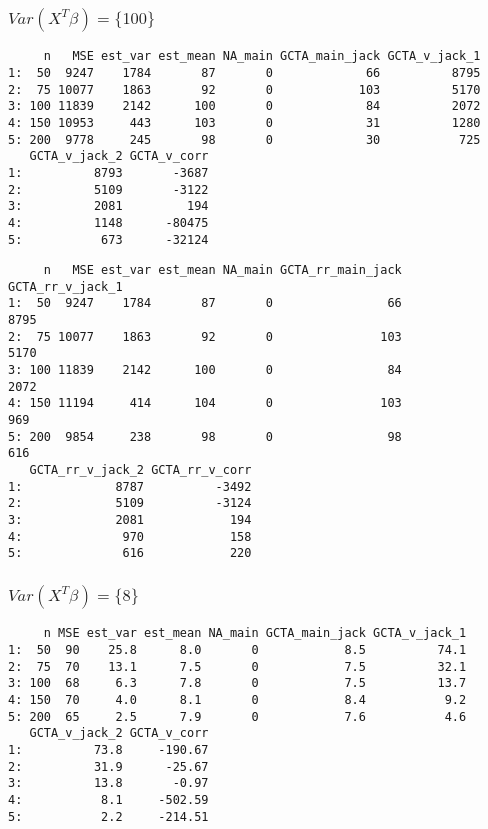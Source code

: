\documentclass[]{article}
\begin{document}
\subsubsection{\texorpdfstring{\(Var(X^T\beta) = \{100\}\)}{Var(X\^{}T\textbackslash{}beta) = \textbackslash{}\{100\textbackslash{}\}}}\label{varxtbeta-100}

\begin{verbatim}
     n   MSE est_var est_mean NA_main GCTA_main_jack GCTA_v_jack_1
1:  50  9247    1784       87       0             66          8795
2:  75 10077    1863       92       0            103          5170
3: 100 11839    2142      100       0             84          2072
4: 150 10953     443      103       0             31          1280
5: 200  9778     245       98       0             30           725
   GCTA_v_jack_2 GCTA_v_corr
1:          8793       -3687
2:          5109       -3122
3:          2081         194
4:          1148      -80475
5:           673      -32124
\end{verbatim}

\begin{verbatim}
     n   MSE est_var est_mean NA_main GCTA_rr_main_jack GCTA_rr_v_jack_1
1:  50  9247    1784       87       0                66             8795
2:  75 10077    1863       92       0               103             5170
3: 100 11839    2142      100       0                84             2072
4: 150 11194     414      104       0               103              969
5: 200  9854     238       98       0                98              616
   GCTA_rr_v_jack_2 GCTA_rr_v_corr
1:             8787          -3492
2:             5109          -3124
3:             2081            194
4:              970            158
5:              616            220
\end{verbatim}

\subsubsection{\texorpdfstring{\(Var(X^T\beta) = \{8\}\)}{Var(X\^{}T\textbackslash{}beta) = \textbackslash{}\{8\textbackslash{}\}}}\label{varxtbeta-8}

\begin{verbatim}
     n MSE est_var est_mean NA_main GCTA_main_jack GCTA_v_jack_1
1:  50  90    25.8      8.0       0            8.5          74.1
2:  75  70    13.1      7.5       0            7.5          32.1
3: 100  68     6.3      7.8       0            7.5          13.7
4: 150  70     4.0      8.1       0            8.4           9.2
5: 200  65     2.5      7.9       0            7.6           4.6
   GCTA_v_jack_2 GCTA_v_corr
1:          73.8     -190.67
2:          31.9      -25.67
3:          13.8       -0.97
4:           8.1     -502.59
5:           2.2     -214.51
\end{verbatim}
\end{document}
